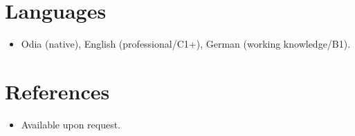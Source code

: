 \documentclass[11pt,a4paper,sans]{moderncv}
\begin{document}

\section{Languages}
\vspace{1pt}
\begin{itemize}
\item Odia (native), English (professional/C1+), German (working knowledge/B1).
\end{itemize}


\section{References}
\vspace{1pt}
\begin{itemize}
\item{Available upon request.}
\end{itemize}
\end{document}
